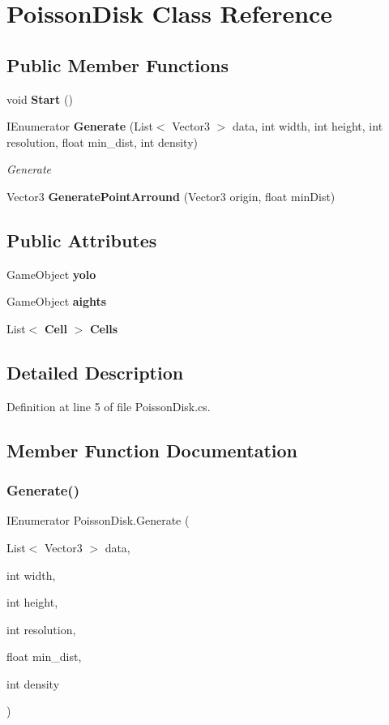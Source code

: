 \section{Poisson\+Disk Class Reference}
\label{class_poisson_disk}
\subsection*{Public Member Functions}
\begin{DoxyCompactItemize}
\item 
void \textbf{ Start} ()
\item 
I\+Enumerator \textbf{ Generate} (List$<$ Vector3 $>$ data, int width, int height, int resolution, float min\+\_\+dist, int density)
\begin{DoxyCompactList}\small\item\em Generate \end{DoxyCompactList}\item 
Vector3 \textbf{ Generate\+Point\+Arround} (Vector3 origin, float min\+Dist)
\end{DoxyCompactItemize}
\subsection*{Public Attributes}
\begin{DoxyCompactItemize}
\item 
Game\+Object \textbf{ yolo}
\item 
Game\+Object \textbf{ aights}
\item 
List$<$ \textbf{ Cell} $>$ \textbf{ Cells}
\end{DoxyCompactItemize}


\subsection{Detailed Description}


Definition at line 5 of file Poisson\+Disk.\+cs.



\subsection{Member Function Documentation}
\mbox{\label{class_poisson_disk_a21289b00f2e00d10cfb7f51d6412ec9c}} 
\subsubsection{Generate()}
{\footnotesize\ttfamily I\+Enumerator Poisson\+Disk.\+Generate (\begin{DoxyParamCaption}\item[{List$<$ Vector3 $>$}]{data,  }\item[{int}]{width,  }\item[{int}]{height,  }\item[{int}]{resolution,  }\item[{float}]{min\+\_\+dist,  }\item[{int}]{density }\end{DoxyParamCaption})}



